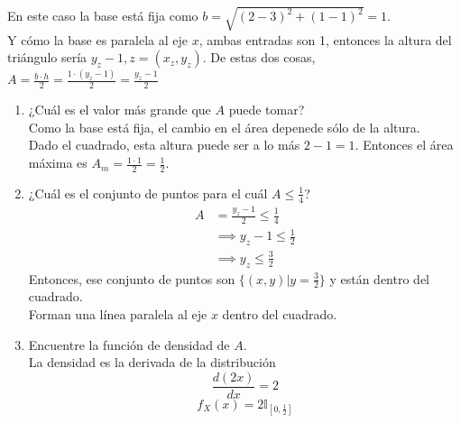 \documentclass[12pt,a4paper]{report}
\begin{document}
\begin{enumerate}
{			En este caso la base está fija como $b = \sqrt{(2-3)^2+(1-1)^2} = 1$.\\
			Y cómo la base es paralela al eje $x$, ambas entradas son 1,
			entonces la altura del triángulo sería $y_z-1, z = (x_z, y_z)$.
			De estas dos cosas, $A = \frac{b \cdot h}{2} = \frac{1 \cdot(y_z-1)}{2}
			= \frac{y_z-1}{2}$
			\begin{enumerate}
				\item {
					¿Cuál es el valor más grande que $A$ puede tomar?\\
					Como la base está fija, el cambio en el área depenede sólo
					de la altura.\\
					Dado el cuadrado, esta altura puede ser a lo más $2-1 = 1$.
					Entonces el área máxima es $A_m = \frac{1\cdot 1}{2} = \frac{1}{2}$.
				}
				\item {
					¿Cuál es el conjunto de puntos para el cuál $A \leq \frac{1}{4}$?
					\begin{align*}
						A &= \frac{y_z-1}{2} \leq \frac{1}{4}\\
						  &\implies y_z-1 \leq \frac{1}{2}\\
						  &\implies y_z \leq \frac{3}{2}
					\end{align*}
					Entonces, ese conjunto de puntos son $\{(x, y) | y = \frac{3}{2}\}$
					y están dentro del cuadrado.\\
					Forman una línea paralela al eje $x$ dentro del cuadrado.
				}
				\item {
					Encuentre la función de densidad de $A$.\\
					La densidad es la derivada de la distribución
					\[\frac{d(2x)}{dx} = 2\]
					\[f_X(x) = 2 \mathbb{I}_{[0, \frac{1}{2}]}\]

}
\end{enumerate}}
\end{enumerate}
\end{document}
